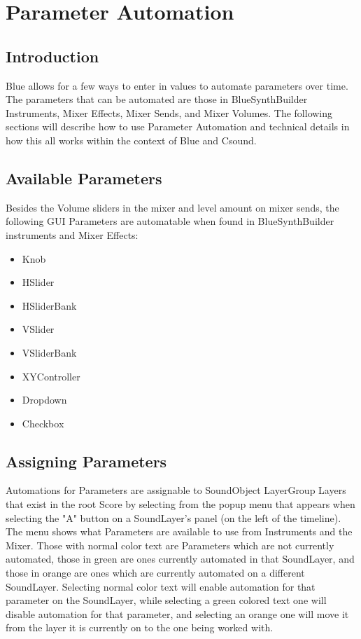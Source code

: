\section{Parameter Automation}\label{parameterAutomation}

\subsection{Introduction}

Blue allows for a few ways to enter in values to automate parameters
over time. The parameters that can be automated are those in
BlueSynthBuilder Instruments, Mixer Effects, Mixer Sends, and Mixer
Volumes. The following sections will describe how to use Parameter
Automation and technical details in how this all works within the
context of Blue and Csound.

\subsection{Available Parameters}

Besides the Volume sliders in the mixer and level amount on mixer sends,
the following GUI Parameters are automatable when found in
BlueSynthBuilder instruments and Mixer Effects:

\begin{itemize}
\item
  Knob
\item
  HSlider
\item
  HSliderBank
\item
  VSlider
\item
  VSliderBank
\item
  XYController
\item
  Dropdown
\item
  Checkbox
\end{itemize}

\subsection{Assigning Parameters}

Automations for Parameters are assignable to SoundObject LayerGroup
Layers that exist in the root Score by selecting from the popup menu
that appears when selecting the "A" button on a SoundLayer's panel (on
the left of the timeline). The menu shows what Parameters are available
to use from Instruments and the Mixer. Those with normal color text are
Parameters which are not currently automated, those in green are ones
currently automated in that SoundLayer, and those in orange are ones
which are currently automated on a different SoundLayer. Selecting
normal color text will enable automation for that parameter on the
SoundLayer, while selecting a green colored text one will disable
automation for that parameter, and selecting an orange one will move it
from the layer it is currently on to the one being worked with.

